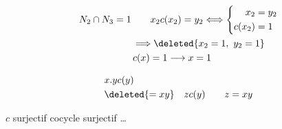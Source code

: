 \[
\begin{aligned}
N_2\cap N_3&=1\qquad x_2c(x_2)=y_2\Longleftrightarrow
\left\{\begin{aligned}x_2&=y_2\\c(x_2)&=1\end{aligned}\right.\\
&\qquad\Longrightarrow\deleted{x_2=1,\ y_2=1}\\
&\qquad c(x)=1\longrightarrow x=1
\end{aligned}
\]

\[
\begin{aligned}
&x.yc(y)\\
&\deleted{=xy}\quad zc(y)\qquad z=xy
\end{aligned}
\]

$c$ surjectif cocycle surjectif \ldots

